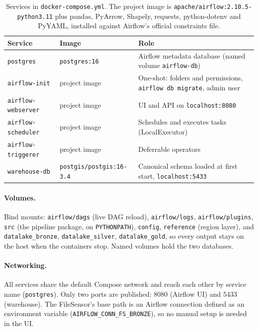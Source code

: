 \documentclass[11pt,a4paper]{article}
\newcommand{\code}[1]{\texttt{\small #1}}
\begin{document}
\begin{table}[H]
\centering
\small
\begin{tabular}{L{3.2cm}L{4.0cm}L{7.3cm}}
\toprule
\textbf{Service} & \textbf{Image} & \textbf{Role} \\
\midrule
\code{postgres} & \code{postgres:16} & Airflow metadata database (named volume \code{airflow-db}) \\
\code{airflow-init} & project image & One-shot: folders and permissions, \code{airflow db migrate}, admin user \\
\code{airflow-webserver} & project image & UI and API on \code{localhost:8080} \\
\code{airflow-scheduler} & project image & Schedules and executes tasks (LocalExecutor) \\
\code{airflow-triggerer} & project image & Deferrable operators \\
\code{warehouse-db} & \code{postgis/postgis:16-3.4} & Canonical schema loaded at first start, \code{localhost:5433} \\
\bottomrule
\end{tabular}
\caption{Services in \code{docker-compose.yml}. The project image is \code{apache/airflow:2.10.5-python3.11}
plus pandas, PyArrow, Shapely, requests, python-dotenv and PyYAML, installed against Airflow's
official constraints file.}
\end{table}

\paragraph{Volumes.} Bind mounts: \code{airflow/dags} (live DAG reload), \code{airflow/logs},
\code{airflow/plugins}, \code{src} (the pipeline package, on \code{PYTHONPATH}), \code{config},
\code{reference} (region layer), and \code{datalake\_bronze}, \code{datalake\_silver},
\code{datalake\_gold}, so every output stays on the host when the containers stop. Named volumes hold
the two databases.

\paragraph{Networking.} All services share the default Compose network and reach each other by service
name (\code{postgres}). Only two ports are published: 8080 (Airflow UI) and 5433 (warehouse). The
FileSensor's base path is an Airflow connection defined as an environment variable
(\code{AIRFLOW\_CONN\_FS\_BRONZE}), so no manual setup is needed in the UI.
\end{document}
